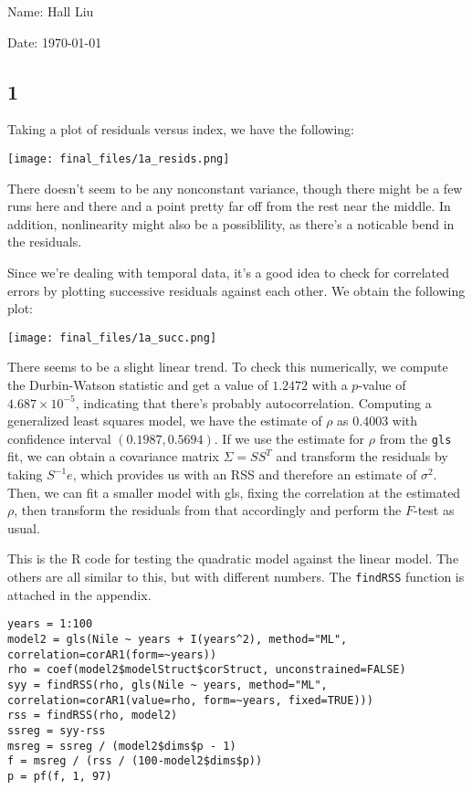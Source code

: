\documentclass{article}
\begin{document}
Name: Hall Liu

Date: \today 
\subsection*{1}
Taking a plot of residuals versus index, we have the following:

\texttt{[image: final\_files/1a\_resids.png]}

There doesn't seem to be any nonconstant variance, though there might be a few runs here and there and a point pretty far off from the rest near the middle. In addition, nonlinearity might also be a possiblility, as there's a noticable bend in the residuals.

Since we're dealing with temporal data, it's a good idea to check for correlated errors by plotting successive residuals against each other. We obtain the following plot:

\texttt{[image: final\_files/1a\_succ.png]}

There seems to be a slight linear trend. To check this numerically, we compute the Durbin-Watson statistic and get a value of $1.2472$ with a $p$-value of $4.687\times10^{-5}$, indicating that there's probably autocorrelation.
Computing a generalized least squares model, we have the estimate of $\rho$ as $0.4003$ with confidence interval $(0.1987, 0.5694)$.
If we use the estimate for $\rho$ from the \verb|gls| fit, we can obtain a covariance matrix $\Sigma=SS^T$ and transform the residuals by taking $S^{-1}e$, which provides us with an RSS and therefore an estimate of $\sigma^2$. Then, we can fit a smaller model with gls, fixing the correlation at the estimated $\rho$, then transform the residuals from that accordingly and perform the $F$-test as usual.

This is the R code for testing the quadratic model against the linear model. The others are all similar to this, but with different numbers. The \verb|findRSS| function is attached in the appendix.

\begin{verbatim}
years = 1:100
model2 = gls(Nile ~ years + I(years^2), method="ML", correlation=corAR1(form=~years))
rho = coef(model2$modelStruct$corStruct, unconstrained=FALSE)
syy = findRSS(rho, gls(Nile ~ years, method="ML", correlation=corAR1(value=rho, form=~years, fixed=TRUE)))
rss = findRSS(rho, model2)
ssreg = syy-rss
msreg = ssreg / (model2$dims$p - 1)
f = msreg / (rss / (100-model2$dims$p))
p = pf(f, 1, 97)
\end{verbatim}
\end{document}
